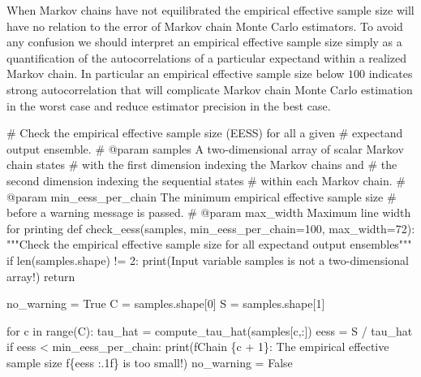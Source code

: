 \documentclass[
  letterpaper,
  DIV=11,
  numbers=noendperiod]{scrartcl}
\newenvironment{Shaded}{\begin{snugshade}}{\end{snugshade}}
\newcommand{\BuiltInTok}[1]{\textcolor[rgb]{0.00,0.23,0.31}{#1}}
\newcommand{\CommentTok}[1]{\textcolor[rgb]{0.37,0.37,0.37}{#1}}
\newcommand{\ControlFlowTok}[1]{\textcolor[rgb]{0.00,0.23,0.31}{#1}}
\newcommand{\DecValTok}[1]{\textcolor[rgb]{0.68,0.00,0.00}{#1}}
\newcommand{\KeywordTok}[1]{\textcolor[rgb]{0.00,0.23,0.31}{#1}}
\newcommand{\NormalTok}[1]{\textcolor[rgb]{0.00,0.23,0.31}{#1}}
\newcommand{\OperatorTok}[1]{\textcolor[rgb]{0.37,0.37,0.37}{#1}}
\newcommand{\SpecialCharTok}[1]{\textcolor[rgb]{0.37,0.37,0.37}{#1}}
\newcommand{\SpecialStringTok}[1]{\textcolor[rgb]{0.13,0.47,0.30}{#1}}
\newcommand{\StringTok}[1]{\textcolor[rgb]{0.13,0.47,0.30}{#1}}
\newcommand{\VariableTok}[1]{\textcolor[rgb]{0.07,0.07,0.07}{#1}}
\begin{document}
When Markov chains have not equilibrated the empirical effective sample
size will have no relation to the error of Markov chain Monte Carlo
estimators. To avoid any confusion we should interpret an empirical
effective sample size simply as a quantification of the autocorrelations
of a particular expectand within a realized Markov chain. In particular
an empirical effective sample size below \(100\) indicates strong
autocorrelation that will complicate Markov chain Monte Carlo estimation
in the worst case and reduce estimator precision in the best case.

\begin{Shaded}
\begin{Highlighting}[]
\CommentTok{\# Check the empirical effective sample size (EESS) for all a given}
\CommentTok{\# expectand output ensemble.}
\CommentTok{\# @param samples A two{-}dimensional array of scalar Markov chain states}
\CommentTok{\#                with the first dimension indexing the Markov chains and}
\CommentTok{\#                the second dimension indexing the sequential states}
\CommentTok{\#                within each Markov chain.}
\CommentTok{\# @param min\_eess\_per\_chain The minimum empirical effective sample size}
\CommentTok{\#                           before a warning message is passed.}
\CommentTok{\# @param max\_width Maximum line width for printing}
\KeywordTok{def}\NormalTok{ check\_eess(samples, min\_eess\_per\_chain}\OperatorTok{=}\DecValTok{100}\NormalTok{, max\_width}\OperatorTok{=}\DecValTok{72}\NormalTok{):}
  \CommentTok{"""Check the empirical effective sample size for all expectand }
\CommentTok{     output ensembles"""}
  \ControlFlowTok{if} \BuiltInTok{len}\NormalTok{(samples.shape) }\OperatorTok{!=} \DecValTok{2}\NormalTok{:}
    \BuiltInTok{print}\NormalTok{(}\StringTok{\textquotesingle{}Input variable \textasciigrave{}samples\textasciigrave{} is not a two{-}dimensional array!\textquotesingle{}}\NormalTok{)}
    \ControlFlowTok{return}
  
\NormalTok{  no\_warning }\OperatorTok{=} \VariableTok{True}
\NormalTok{  C }\OperatorTok{=}\NormalTok{ samples.shape[}\DecValTok{0}\NormalTok{]}
\NormalTok{  S }\OperatorTok{=}\NormalTok{ samples.shape[}\DecValTok{1}\NormalTok{]}
  
  \ControlFlowTok{for}\NormalTok{ c }\KeywordTok{in} \BuiltInTok{range}\NormalTok{(C):}
\NormalTok{    tau\_hat }\OperatorTok{=}\NormalTok{ compute\_tau\_hat(samples[c,:])}
\NormalTok{    eess }\OperatorTok{=}\NormalTok{ S }\OperatorTok{/}\NormalTok{ tau\_hat}
    \ControlFlowTok{if}\NormalTok{ eess }\OperatorTok{\textless{}}\NormalTok{ min\_eess\_per\_chain:}
      \BuiltInTok{print}\NormalTok{(}\SpecialStringTok{f\textquotesingle{}Chain }\SpecialCharTok{\{}\NormalTok{c }\OperatorTok{+} \DecValTok{1}\SpecialCharTok{\}}\SpecialStringTok{: The empirical effective sample size \textquotesingle{}}
            \SpecialStringTok{f\textquotesingle{}}\SpecialCharTok{\{}\NormalTok{eess }\SpecialCharTok{:.1f\}}\SpecialStringTok{ is too small!\textquotesingle{}}\NormalTok{)}
\NormalTok{      no\_warning }\OperatorTok{=} \VariableTok{False}
  

\end{Highlighting}
\end{Shaded}
\end{document}
